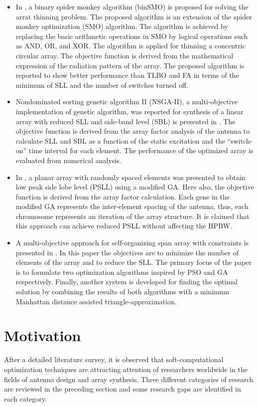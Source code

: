 \begin{itemize}
\item In \cite{arrayThin2}, a binary spider monkey algorithm (binSMO) is proposed for solving the arrat thinning problem. The proposed algorithm is an extension of the spider monkey optimization (SMO) algorithm. The algorithm is achieved by replacing the basic arithmetic operations in SMO by logical operations such as AND, OR, and XOR. The algorithm is applied for thinning a concentric circular array. The objective function is derived from the mathematical expression of the radiation pattern of the array. The proposed algorithm is reported to show better performance than TLBO and FA in terms of the minimum of SLL and the number of switches turned off.
\item Nondominated sorting genetic algorithm II (NSGA-II), a multi-objective implementation of genetic algorithm, was reported for synthesis of a linear array with reduced SLL and side-band level (SBL) is presented in \cite{arraySynth2}. The objective function is derived from the array factor analysis of the antenna to calculate SLL and SBL as a function of the static excitation and the ``switch-on'' time interval for each element. The performance of the optimized array is evaluated from numerical analysis.
\item In \cite{randomlySpacedArray}, a planar array with randomly spaced elements was presented to obtain low peak side lobe level (PSLL) using a modified GA. Here also, the objective function is derived from the array factor calculation. Each gene in the modified GA represents the inter-element spacing of the antenna, thus, each chromosome represents an iteration of the array structure. It is claimed that this approach can achieve reduced PSLL without affecting the HPBW.
\item A multi-objective approach for self-organizing span array with constraints is presented in \cite{selfOrgOpt}. In this paper the objectives are to minimize the number of elements of the array and to reduce the SLL. The primary focus of the paper is to formulate two optimization algorithms inspired by PSO and GA respectively. Finally, another system is developed for finding the optimal solution by combining the results of both algorithms with a minimum Manhattan distance assisted triangle-approximation.
\end{itemize}

\section{Motivation} \label{c1sec_motiv}
After a detailed literature survey, it is observed that soft-computational optimization techniques are attracting attention of researchers worldwide in the fields of antenna design and array synthesis. Three different categories of research are reviewed in the preceding section and some research gaps are identified in each category.


